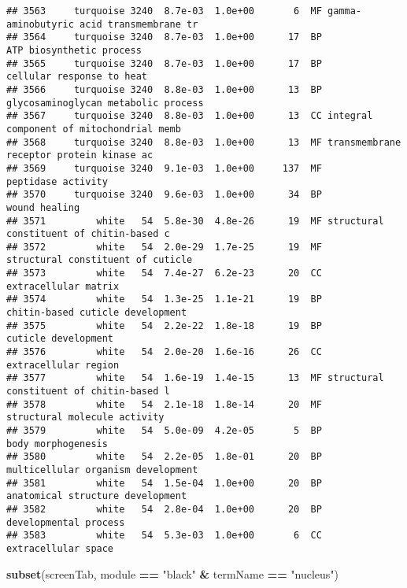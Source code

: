 \documentclass[]{article}
\newenvironment{Shaded}{\begin{snugshade}}{\end{snugshade}}
\newcommand{\KeywordTok}[1]{\textcolor[rgb]{0.13,0.29,0.53}{\textbf{#1}}}
\newcommand{\NormalTok}[1]{#1}
\newcommand{\OperatorTok}[1]{\textcolor[rgb]{0.81,0.36,0.00}{\textbf{#1}}}
\newcommand{\StringTok}[1]{\textcolor[rgb]{0.31,0.60,0.02}{#1}}
\begin{document}
\begin{verbatim}
## 3563     turquoise 3240  8.7e-03  1.0e+00       6  MF gamma-aminobutyric acid transmembrane tr
## 3564     turquoise 3240  8.7e-03  1.0e+00      17  BP                 ATP biosynthetic process
## 3565     turquoise 3240  8.7e-03  1.0e+00      17  BP                cellular response to heat
## 3566     turquoise 3240  8.8e-03  1.0e+00      13  BP      glycosaminoglycan metabolic process
## 3567     turquoise 3240  8.8e-03  1.0e+00      13  CC integral component of mitochondrial memb
## 3568     turquoise 3240  8.8e-03  1.0e+00      13  MF transmembrane receptor protein kinase ac
## 3569     turquoise 3240  9.1e-03  1.0e+00     137  MF                       peptidase activity
## 3570     turquoise 3240  9.6e-03  1.0e+00      34  BP                            wound healing
## 3571         white   54  5.8e-30  4.8e-26      19  MF structural constituent of chitin-based c
## 3572         white   54  2.0e-29  1.7e-25      19  MF        structural constituent of cuticle
## 3573         white   54  7.4e-27  6.2e-23      20  CC                     extracellular matrix
## 3574         white   54  1.3e-25  1.1e-21      19  BP         chitin-based cuticle development
## 3575         white   54  2.2e-22  1.8e-18      19  BP                      cuticle development
## 3576         white   54  2.0e-20  1.6e-16      26  CC                     extracellular region
## 3577         white   54  1.6e-19  1.4e-15      13  MF structural constituent of chitin-based l
## 3578         white   54  2.1e-18  1.8e-14      20  MF             structural molecule activity
## 3579         white   54  5.0e-09  4.2e-05       5  BP                       body morphogenesis
## 3580         white   54  2.2e-05  1.8e-01      20  BP       multicellular organism development
## 3581         white   54  1.5e-04  1.0e+00      20  BP         anatomical structure development
## 3582         white   54  2.8e-04  1.0e+00      20  BP                    developmental process
## 3583         white   54  5.3e-03  1.0e+00       6  CC                      extracellular space
\end{verbatim}

\begin{Shaded}
\begin{Highlighting}[]
\KeywordTok{subset}\NormalTok{(screenTab, module }\OperatorTok{==}\StringTok{ "black"} \OperatorTok{&}\StringTok{ }\NormalTok{termName }\OperatorTok{==}\StringTok{ "nucleus"}\NormalTok{)}
\end{Highlighting}
\end{Shaded}
\end{document}
